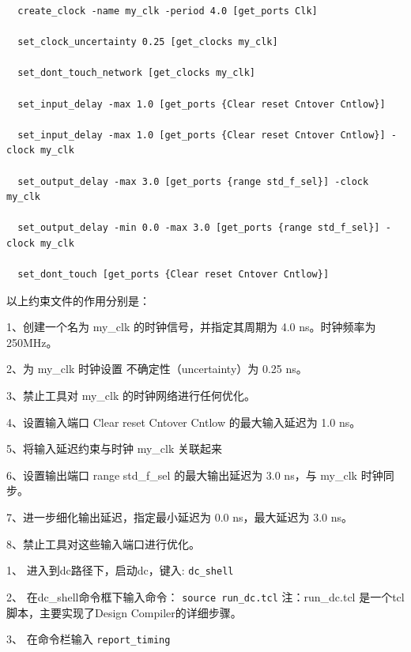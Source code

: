 \begin{verbatim}
  create_clock -name my_clk -period 4.0 [get_ports Clk]

  set_clock_uncertainty 0.25 [get_clocks my_clk]
  
  set_dont_touch_network [get_clocks my_clk]
  
  set_input_delay -max 1.0 [get_ports {Clear reset Cntover Cntlow}]
  
  set_input_delay -max 1.0 [get_ports {Clear reset Cntover Cntlow}] -clock my_clk
  
  set_output_delay -max 3.0 [get_ports {range std_f_sel}] -clock my_clk
  
  set_output_delay -min 0.0 -max 3.0 [get_ports {range std_f_sel}] -clock my_clk
  
  set_dont_touch [get_ports {Clear reset Cntover Cntlow}]
\end{verbatim}

以上约束文件的作用分别是：

1、创建一个名为 my\_clk 的时钟信号，并指定其周期为 4.0 ns。时钟频率为 250MHz。

2、为 my\_clk 时钟设置 不确定性（uncertainty）为 0.25 ns。

3、禁止工具对 my\_clk 的时钟网络进行任何优化。

4、设置输入端口 Clear reset Cntover Cntlow 的最大输入延迟为 1.0 ns。

5、将输入延迟约束与时钟 my\_clk 关联起来

6、设置输出端口 range std\_f\_sel 的最大输出延迟为 3.0 ns，与 my\_clk 时钟同步。

7、进一步细化输出延迟，指定最小延迟为 0.0 ns，最大延迟为 3.0 ns。

8、禁止工具对这些输入端口进行优化。


1、	进入到dc路径下，启动dc，键入: \texttt{dc\_shell}

2、	在dc\_shell命令框下输入命令： \texttt{source run\_dc.tcl}
注：run\_dc.tcl 是一个tcl脚本，主要实现了Design Compiler的详细步骤。

3、	在命令栏输入 \texttt{report\_timing}

